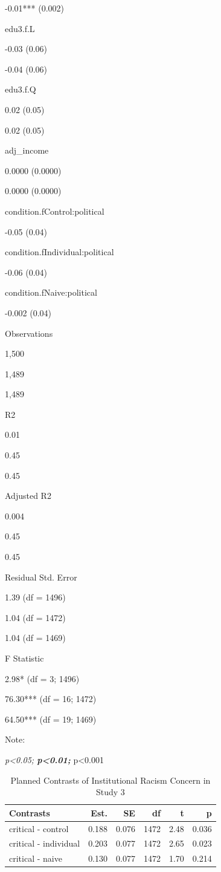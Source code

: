 \documentclass[
]{book}
\begin{document}
-0.01*** (0.002)

edu3.f.L

-0.03 (0.06)

-0.04 (0.06)

edu3.f.Q

0.02 (0.05)

0.02 (0.05)

adj\_income

0.0000 (0.0000)

0.0000 (0.0000)

condition.fControl:political

-0.05 (0.04)

condition.fIndividual:political

-0.06 (0.04)

condition.fNaive:political

-0.002 (0.04)

Observations

1,500

1,489

1,489

R2

0.01

0.45

0.45

Adjusted R2

0.004

0.45

0.45

Residual Std. Error

1.39 (df = 1496)

1.04 (df = 1472)

1.04 (df = 1469)

F Statistic

2.98* (df = 3; 1496)

76.30*** (df = 16; 1472)

64.50*** (df = 19; 1469)

Note:

\emph{p\textless0.05; \textbf{p\textless0.01; }}p\textless0.001

\begin{table}

\caption{\label{tab:society-contrast-s3}Planned Contrasts of Institutional Racism Concern in Study 3}
\centering
\fontsize{13}{15}\selectfont
\begin{tabular}[t]{lrrrrr}
\toprule
Contrasts & Est. & SE & df & t & p\\
\midrule
critical - control & 0.188 & 0.076 & 1472 & 2.48 & 0.036\\
critical - individual & 0.203 & 0.077 & 1472 & 2.65 & 0.023\\
critical - naive & 0.130 & 0.077 & 1472 & 1.70 & 0.214\\
\bottomrule
\end{tabular}
\end{table}
\end{document}
